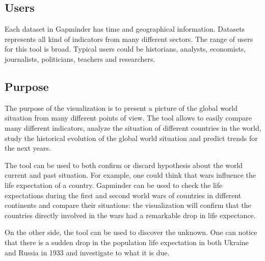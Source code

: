 \subsection{Users}
Each dataset in Gapminder has time and geographical information.
Datasets represents all kind of indicators from many different sectors.
The range of users for this tool is broad.
Typical users could be historians, analysts, economists, journalists, politicians, teachers and researchers.

\subsection{Purpose}
The purpose of the visualization is to present a picture of the global world situation from many different points of view.
The tool allows to easily compare many different indicators, analyze the situation of different countries in the world, study the historical evolution of the global world situation and predict trends for the next years.

The tool can be used to both confirm or discard hypothesis about the world current and past situation.
For example, one could think that wars influence the life expectation of a country.
Gapminder can be used to check the life expectations during the first and second world wars of countries in different continents and compare their situations:
the visualization will confirm that the countries directly involved in the wars had a remarkable drop in life expectance.

On the other side, the tool can be used to discover the unknown.
One can notice that there is a sudden drop in the population life expectation in both Ukraine and Russia in 1933 and investigate to what it is due.